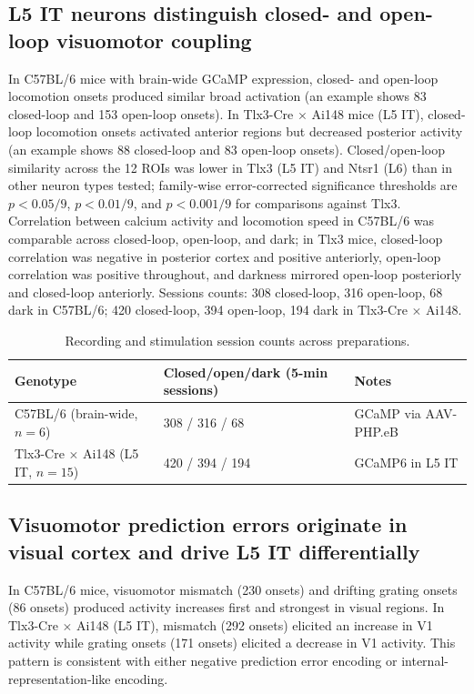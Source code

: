\documentclass[11pt]{article}
\begin{document}
\subsection{L5 IT neurons distinguish closed- and open-loop visuomotor coupling}
In C57BL/6 mice with brain-wide GCaMP expression, closed- and open-loop locomotion onsets produced similar broad activation (an example shows 83 closed-loop and 153 open-loop onsets). In Tlx3-Cre $\times$ Ai148 mice (L5 IT), closed-loop locomotion onsets activated anterior regions but decreased posterior activity (an example shows 88 closed-loop and 83 open-loop onsets). Closed/open-loop similarity across the 12 ROIs was lower in Tlx3 (L5 IT) and Ntsr1 (L6) than in other neuron types tested; family-wise error-corrected significance thresholds are $p < 0.05/9$, $p < 0.01/9$, and $p < 0.001/9$ for comparisons against Tlx3. Correlation between calcium activity and locomotion speed in C57BL/6 was comparable across closed-loop, open-loop, and dark; in Tlx3 mice, closed-loop correlation was negative in posterior cortex and positive anteriorly, open-loop correlation was positive throughout, and darkness mirrored open-loop posteriorly and closed-loop anteriorly. Sessions counts: 308 closed-loop, 316 open-loop, 68 dark in C57BL/6; 420 closed-loop, 394 open-loop, 194 dark in Tlx3-Cre $\times$ Ai148.

\begin{table}[h]
\centering
\caption{Recording and stimulation session counts across preparations.}
\begin{tabular}{lll}
\toprule
Genotype & Closed/open/dark (5-min sessions) & Notes \\
\midrule
C57BL/6 (brain-wide, $n=6$) & 308 / 316 / 68 & GCaMP via AAV-PHP.eB \\
Tlx3-Cre $\times$ Ai148 (L5 IT, $n=15$) & 420 / 394 / 194 & GCaMP6 in L5 IT \\
\bottomrule
\end{tabular}
\end{table}

\subsection{Visuomotor prediction errors originate in visual cortex and drive L5 IT differentially}
In C57BL/6 mice, visuomotor mismatch (230 onsets) and drifting grating onsets (86 onsets) produced activity increases first and strongest in visual regions. In Tlx3-Cre $\times$ Ai148 (L5 IT), mismatch (292 onsets) elicited an increase in V1 activity while grating onsets (171 onsets) elicited a decrease in V1 activity. This pattern is consistent with either negative prediction error encoding or internal-representation-like encoding.
\end{document}
